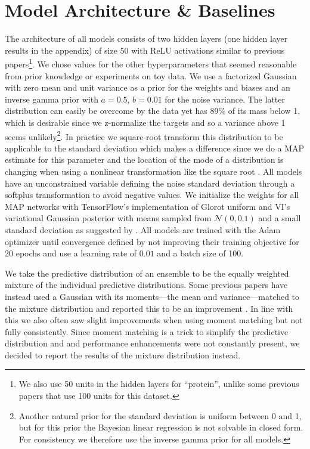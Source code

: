 \documentclass[../thesis.tex]{subfiles}
\begin{document}
\section{Model Architecture \& Baselines}
The architecture of all models consists of two hidden layers (one hidden layer results in the appendix) of size 50 with ReLU activations similar to previous papers\footnote{We also use 50 units in the hidden layers for ``protein'', unlike some previous papers that use 100 units for this dataset.}. We chose values for the other hyperparameters that seemed reasonable from prior knowledge or experiments on toy data.
We use a factorized Gaussian with zero mean and unit variance as a prior for the weights and biases and an inverse gamma prior with $a=0.5$, $b=0.01$ for the noise variance. The latter distribution can easily be overcome by the data yet has 89\% of its mass below 1, which is desirable since we z-normalize the targets and so a variance above 1 seems unlikely\footnote{Another natural prior for the standard deviation is uniform between 0 and 1, but for this prior the Bayesian linear regression is not solvable in closed form. For consistency we therefore use the inverse gamma prior for all models.}.
In practice we square-root transform this distribution to be applicable to the standard deviation which makes a difference since we do a MAP estimate for this parameter and the location of the mode of a distribution is changing when using a nonlinear transformation like the square root \parencite[Chapter~1.2.1]{bishop2006pattern}. All models have an unconstrained variable defining the noise standard deviation through a softplus transformation to avoid negative values. We initialize the weights for all MAP networks with TensorFlow's implementation of Glorot uniform \parencite{glorot2010understanding} and VI's variational Gaussian posterior with means sampled from $\mathcal{N}(0, 0.1)$ and a small standard deviation as suggested by \textcite{hernandez2016black}. All models are trained with the Adam optimizer \parencite{kingma2014adam} until convergence defined by not improving their training objective for 20 epochs and use a learning rate of $0.01$ and a batch size of 100.

We take the predictive distribution of an ensemble to be the equally weighted mixture of the individual predictive distributions. Some previous papers have instead used a Gaussian with its moments---the mean and variance---matched to the mixture distribution and reported this to be an improvement \parencite{lakshminarayanan2017simple}. In line with this we also often saw slight improvements when using moment matching but not fully consistently. Since moment matching is a trick to simplify the predictive distribution and and performance enhancements were not constantly present, we decided to report the results of the mixture distribution instead.
\end{document}
